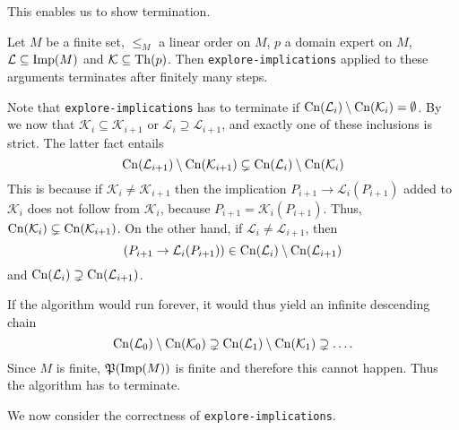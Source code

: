 This enables us to show termination.

\begin{Theorem}
  \label{thm:explore-implications-termination}
  Let $M$ be a finite set, $\leq_M$ a linear order on $M$, $p$ a domain expert on $M$,
  $\mathcal{L} \subseteq \operatorname{Imp}(M)$ and $\mathcal{K} \subseteq \operatorname{Th}(p)$.  Then
  \lstinline{explore-implications} applied to these arguments terminates after finitely
  many steps.
\end{Theorem}
\begin{Proof}
  Note that \lstinline{explore-implications} has to terminate if $\operatorname{Cn}(\mathcal{L}_i)
  \setminus \operatorname{Cn}(\mathcal{K}_i) = \emptyset$.  By
   we now that $\mathcal{K}_i
  \subseteq \mathcal{K}_{i+1}$ or $\mathcal{L}_i \supseteq \mathcal{L}_{i+1}$, and exactly
  one of these inclusions is strict.  The latter fact entails
  \begin{equation}
    \label{eq:36}
    \operatorname{Cn}(\mathcal{L}_{i+1}) \setminus \operatorname{Cn}(\mathcal{K}_{i+1}) \subsetneq \operatorname{Cn}(\mathcal{L}_i)
    \setminus \operatorname{Cn}(\mathcal{K}_i)
  \end{equation}
  This is because if $\mathcal{K}_i \neq \mathcal{K}_{i+1}$ then the implication $P_{i+1}
  \to \mathcal{L}_i(P_{i+1})$ added to $\mathcal{K}_{i}$ does not follow from
  $\mathcal{K}_i$, because $P_{i+1} = \mathcal{K}_{i}(P_{i+1})$.  Thus,
  $\operatorname{Cn}(\mathcal{K}_i) \subsetneq \operatorname{Cn}(\mathcal{K}_{i+1})$.  On the other hand, if
  $\mathcal{L}_i \neq \mathcal{L}_{i+1}$, then
  \begin{equation*}
    (P_{i+1} \to \mathcal{L}_i(P_{i+1})) \in \operatorname{Cn}(\mathcal{L}_i) \setminus \operatorname{Cn}(\mathcal{L}_{i+1})
  \end{equation*}
  and $\operatorname{Cn}(\mathcal{L}_i) \supsetneq \operatorname{Cn}(\mathcal{L}_{i+1})$.

  If the algorithm would run forever, it would thus yield an infinite descending chain
  \begin{equation*}
    \operatorname{Cn}(\mathcal{L}_0) \setminus \operatorname{Cn}(\mathcal{K}_0) \supsetneq \operatorname{Cn}(\mathcal{L}_1)
    \setminus \operatorname{Cn}(\mathcal{K}_1) \supsetneq \dots.
  \end{equation*}
  Since $M$ is finite, ${\mathfrak{P}(\operatorname{Imp}(M))}$ is finite and therefore this cannot happen.
  Thus the algorithm has to terminate.
\end{Proof}

We now consider the correctness of \lstinline{explore-implications}.

